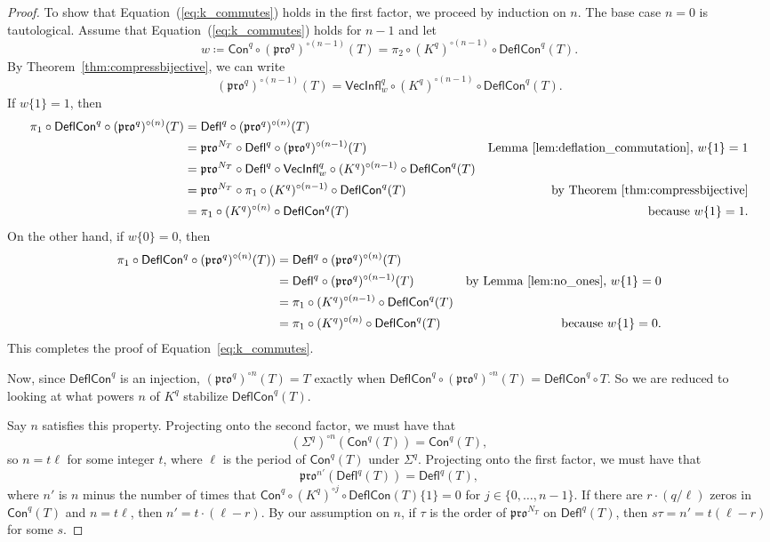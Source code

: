 \documentclass[12pt]{amsart}
\theoremstyle{definition}
\theoremstyle{remark}
\numberwithin{equation}{section}
\newcommand{\pro}{\mathfrak{pro}}
\newcommand{\deflate}{\ensuremath{\mathsf{Defl}}}
\newcommand{\inflate}{\ensuremath{\mathsf{VecInfl}}}
\newcommand{\content}{\ensuremath{\mathsf{Con}}}
\newcommand{\compress}{\ensuremath{\mathsf{DeflCon}}}
\begin{document}
\begin{proof}
To show that Equation~(\ref{eq:k_commutes}) holds in the first factor, we proceed by induction on $n$. The base case $n = 0$ is tautological. Assume that Equation~(\ref{eq:k_commutes}) holds for $n-1$ and let \[ w \coloneqq \content^q \circ (\pro^q)^{\circ (n-1)}(T) = \pi_2 \circ (K^q)^{\circ (n-1)} \circ \compress^q(T). \]  By Theorem~\ref{thm:compressbijective}, we can write
\[ (\pro^q)^{\circ (n-1)}(T) = \inflate^q_{w} \circ (K^q)^{\circ (n-1)} \circ \compress^q(T).\] 
If $w\lbrace 1 \rbrace = 1 $, then
\begin{align*}
\pi_1 \circ \compress^q \circ (\pro^q)^{\circ (n)}(T) &= \deflate^q \circ (\pro^q)^{\circ (n)}(T) \\
&= \pro^{N_T} \circ \deflate^q \circ (\pro^q)^{\circ (n-1)}(T) &\text{Lemma~\ref{lem:deflation_commutation}, $w\lbrace 1 \rbrace = 1$} \\
&= \pro^{N_T} \circ \deflate^q \circ \inflate^q_{w} \circ (K^q)^{\circ (n-1)} \circ \compress^q(T)  \\
&= \pro^{N_T} \circ \pi_1 \circ (K^q)^{\circ (n-1)} \circ \compress^q(T) &\text{by Theorem~\ref{thm:compressbijective}} \\ 
&= \pi_1 \circ (K^q)^{\circ (n)} \circ \compress^q(T) &\text{because $w\lbrace 1 \rbrace = 1$.}
\end{align*}
On the other hand, if $w \lbrace 0 \rbrace = 0$, then 
\begin{align*}
\pi_1 \circ \compress^q \circ (\pro^q)^{\circ (n)}(T)) &= \deflate^q \circ (\pro^q)^{\circ (n)}(T) \\
&= \deflate^q \circ (\pro^q)^{\circ (n-1)}(T) &\text{by Lemma~\ref{lem:no_ones}, $w \lbrace 1 \rbrace = 0$} \\
&= \pi_1  \circ (K^q)^{\circ (n-1)} \circ \compress^q(T)  \\
&= \pi_1 \circ (K^q)^{\circ (n)} \circ \compress^q(T) &\text{because $w\lbrace 1 \rbrace = 0$.}
\end{align*}
This completes the proof of Equation~\ref{eq:k_commutes}.

Now, since $\compress^q$ is an injection, $(\pro^q)^{\circ n}(T) = T$ exactly when $\compress^q \circ (\pro^q)^{\circ n}(T) = \compress^q \circ T$. So we are reduced to looking at what powers $n$ of $K^q$ stabilize $\compress^q(T)$.
 

 
Say $n$ satisfies this property. Projecting onto the second factor, we must have that \[ (\Sigma^q)^{\circ n}(\content^q(T)) = \content^q(T), \] so $n = t \ell$ for some integer $t$, where $\ell$ is the period of $\content^q(T)$ under $\Sigma^q$.  Projecting onto the first factor, we must have that  \[ \pro^{n'}(\deflate^q(T)) = \deflate^q(T), \] where $n'$ is $n$ minus the number of times that $\content^q \circ (K^q)^{\circ j} \circ \compress(T) \lbrace 1 \rbrace = 0$ for $j \in \{ 0, \dots, n-1 \}$. If there are $r \cdot (q/\ell)$ zeros in $\content^q(T)$ and $n = t \ell$, then $n' = t \cdot(\ell - r)$. By our assumption on $n$, if $\tau$ is the order of $\pro^{N_T}$ on $\deflate^q(T)$, then $s \tau = n' = t(\ell - r)$ for some $s$.


\end{proof}
\end{document}
